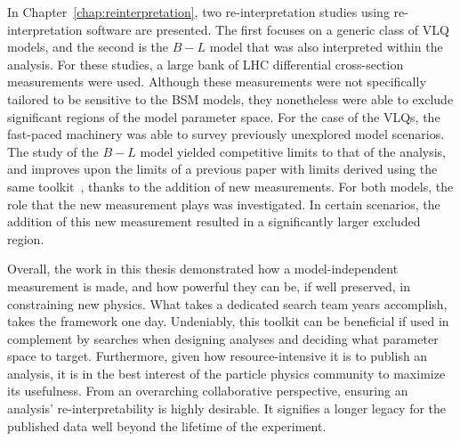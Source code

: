 In Chapter~\ref{chap:reinterpretation}, two re-interpretation studies using re-interpretation software \contur are presented. The first focuses on a generic class of VLQ models, and the second is the $B-L$ model that was also interpreted within the \ATLAS \mFourL{} analysis. For these studies, a large bank of LHC differential cross-section measurements were used. Although these measurements were not specifically tailored to be sensitive to the BSM models, they nonetheless were able to exclude significant regions of the model parameter space. For the case of the VLQs, the fast-paced \contur machinery was able to survey previously unexplored model scenarios. The study of the $B-L$ model yielded competitive limits to that of the \ATLAS \mFourL{} analysis, and improves upon the limits of a previous paper with limits derived using the same toolkit~\cite{BLcontur}, thanks to the addition of new measurements. For both models, the role that the new \ATLAS \mFourL{} measurement plays was investigated. In certain scenarios, the addition of this new measurement resulted in a significantly larger excluded region. 

Overall, the work in this thesis demonstrated how a model-independent measurement is made, and how powerful they can be, if well preserved, in constraining new physics. What takes a dedicated search team years accomplish, takes the \contur framework one day. Undeniably, this toolkit can be beneficial if used in complement by searches when designing analyses and deciding what parameter space to target. Furthermore, given how resource-intensive it is to publish an analysis, it is in the best interest of the particle physics community to maximize its usefulness. From an overarching collaborative perspective, ensuring an analysis' re-interpretability is highly desirable. It signifies a longer legacy for the published data well beyond the lifetime of the experiment. 


